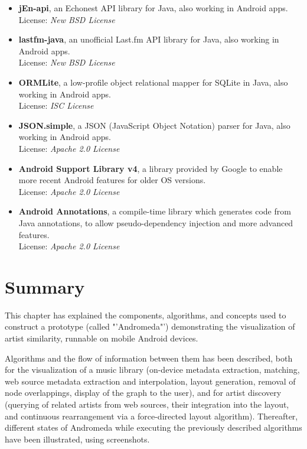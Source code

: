 \begin{itemize}
	
	\item \textbf{jEn-api}, an Echonest API library for Java, also working in Android apps. \\
License: \emph{New BSD License}

	\item \textbf{lastfm-java}, an unofficial Last.fm API library for Java, also working in Android apps. \\
License: \emph{New BSD License}

	\item \textbf{ORMLite}, a low-profile object relational mapper for SQLite in Java, also working in Android apps. \\
License: \emph{ISC License}

	\item \textbf{JSON.simple}, a JSON (JavaScript Object Notation) parser for Java, also working in Android apps. \\
License: \emph{Apache 2.0 License}

	\item \textbf{Android Support Library v4}, a library provided by Google to enable more recent Android features for older OS versions. \\
License: \emph{Apache 2.0 License}

	\item \textbf{Android Annotations}, a compile-time library which generates code from Java annotations, to allow pseudo-dependency injection and more advanced features. \\
License: \emph{Apache 2.0 License}

\end{itemize}

\section{Summary}

This chapter has explained the components, algorithms, and concepts used to construct a prototype (called "'Andromeda"') demonstrating the visualization of artist similarity, runnable on mobile Android devices.

Algorithms and the flow of information between them has been described, both for the visualization of a music library (on-device metadata extraction, matching, web source metadata extraction and interpolation, layout generation, removal of node overlappings, display of the graph to the user), and for artist discovery (querying of related artists from web sources, their integration into the layout, and continuous rearrangement via a force-directed layout algorithm).
Thereafter, different states of Andromeda while executing the previously described algorithms have been illustrated, using screenshots.

